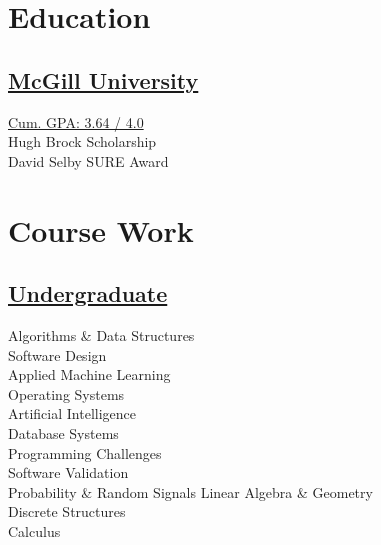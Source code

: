 \documentclass[]{sumbal-resume}
\begin{document}
\header

\begin{minipage}[t]{0.33\textwidth}



\section{Education}
\subsection{\href{http://www.abdullahsumbal.com/doc/transcript.pdf}{McGill University}}
\href{http://www.abdullahsumbal.com/doc/transcript.pdf}{Cum. GPA: 3.64 / 4.0}\\
Hugh Brock Scholarship \\
David Selby SURE Award
\sectionsep

\section{Course Work }
\subsection{\href{http://www.abdullahsumbal.com/doc/transcript.pdf}{Undergraduate}}
Algorithms \& Data Structures \\
Software Design \\
Applied Machine Learning \\
Operating Systems \\
Artificial Intelligence \\
Database Systems\\
Programming Challenges \\
Software Validation \\
Probability \& Random Signals
Linear Algebra \& Geometry \\
Discrete Structures \\
Calculus \\
\sectionsep


\end{minipage}
\end{document}
